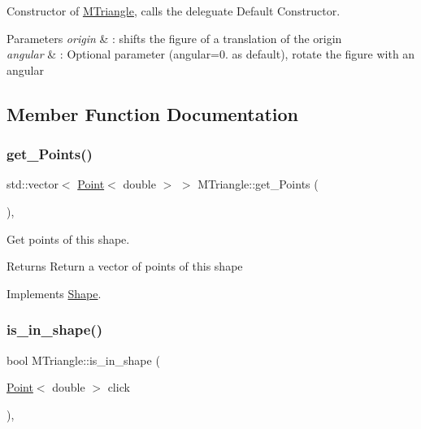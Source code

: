 Constructor of \hyperlink{classMTriangle}{M\+Triangle}, calls the deleguate Default Constructor. 


\begin{DoxyParams}{Parameters}
{\em origin} & \+: shifts the figure of a translation of the origin \\
\hline
{\em angular} & \+: Optional parameter (angular=0. as default), rotate the figure with an angular \\
\hline
\end{DoxyParams}


\subsection{Member Function Documentation}
\mbox{\label{classMTriangle_a90351a097a20d35f9d6c4d05ad881e48}} 
\subsubsection{\texorpdfstring{get\+\_\+\+Points()}{get\_Points()}}
{\footnotesize\ttfamily std\+::vector$<$ \hyperlink{classPoint}{Point}$<$ double $>$ $>$ M\+Triangle\+::get\+\_\+\+Points (\begin{DoxyParamCaption}{ }\end{DoxyParamCaption})\hspace{0.3cm}{\ttfamily [override]}, {\ttfamily [virtual]}}



Get points of this shape. 

\begin{DoxyReturn}{Returns}
Return a vector of points of this shape 
\end{DoxyReturn}


Implements \hyperlink{classShape_add74a5c682840fa4a519242b1ddbd0b5}{Shape}.

\mbox{\label{classMTriangle_a8d3d737a903823bf1a631cbb004a799c}} 
\subsubsection{\texorpdfstring{is\+\_\+in\+\_\+shape()}{is\_in\_shape()}}
{\footnotesize\ttfamily bool M\+Triangle\+::is\+\_\+in\+\_\+shape (\begin{DoxyParamCaption}\item[{\hyperlink{classPoint}{Point}$<$ double $>$}]{click }\end{DoxyParamCaption})\hspace{0.3cm}{\ttfamily [override]}, {\ttfamily [virtual]}}



